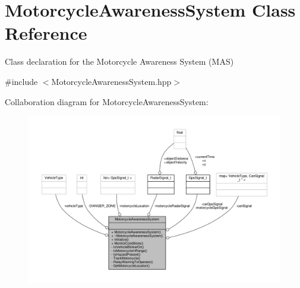 \hypertarget{classMotorcycleAwarenessSystem}{\section{Motorcycle\-Awareness\-System Class Reference}
\label{classMotorcycleAwarenessSystem}
}


Class declaration for the Motorcycle Awareness System (M\-A\-S)  




{\ttfamily \#include $<$Motorcycle\-Awareness\-System.\-hpp$>$}



Collaboration diagram for Motorcycle\-Awareness\-System\-:\nopagebreak
\begin{figure}[H]
\begin{center}
\leavevmode
\includegraphics[width=350pt]{classMotorcycleAwarenessSystem__coll__graph}
\end{center}
\end{figure}
